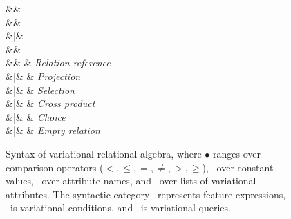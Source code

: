 \documentclass[12pt]{article}
\begin{document}
\begin{figure}[hbt!]
\begin{syntax}
\small
\synDef{\dimMeta}{\ffSet}
  &\eqq& 
\\[1.5ex]

\synDef{\vCond}{\vCondSet}
  &\eqq&  \\
     &|& 
\\[1.5ex]

\synDef{\vAttList}{\vAttSet}
  &\eqq&  
  \\[1.5ex]
  
\synDef{\vQ}{\qSet}
  &\eqq& \vRel                 & \textit{Relation reference} \\
     &|& \vPrj[\vAttList]{\vQ} & \textit{Projection} \\
     &|& \vSel\vQ              & \textit{Selection} \\
     &|& \vQ \times \vQ  & \textit{Cross product} \\
     &|& \chc{\vQ,\vQ}         & \textit{Choice} \\
     &|& \empRel               & \textit{Empty relation} \\
\end{syntax}

\caption{Syntax of variational relational algebra, where $\bullet$ ranges over
comparison operators ($<, \leq, =, \neq, >, \geq$), 
\cte\ over constant values,
\att\ over attribute names, and \vAttList\ over lists of variational attributes.
The syntactic category \dimMeta\ represents feature expressions, \vCond\
is variational conditions, and \vQ\ is variational queries.
}
\label{fig:vra}
\end{figure}
\end{document}
